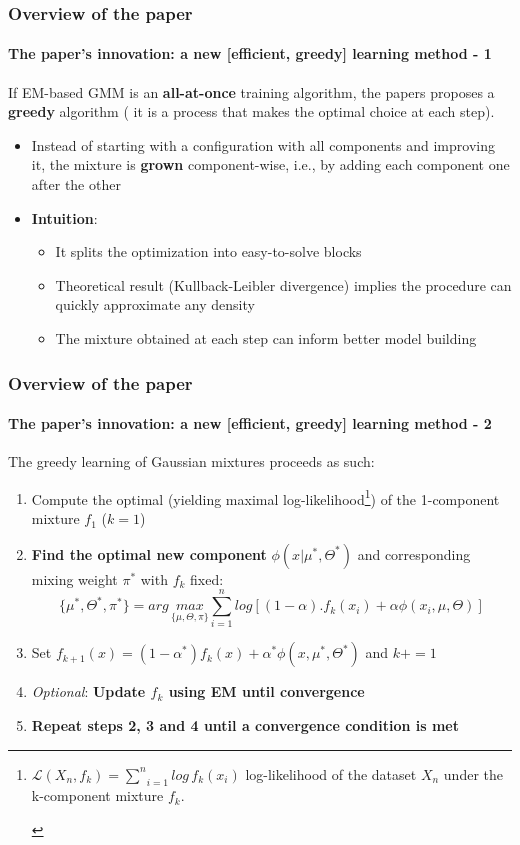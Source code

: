 \documentclass[aspectratio=43]{beamer}
\begin{document}
\begin{frame}
    \frametitle{Overview of the paper}
    \framesubtitle{The paper's innovation: a new [efficient, greedy] learning method - 1}
    If EM-based GMM is an \textbf{all-at-once} training algorithm, the papers proposes a \textbf{greedy} algorithm ( it is a process that makes the optimal choice at each step).
    \begin{small}\begin{itemize}
      \item Instead of starting with a configuration with all components and improving it, the mixture is \textbf{grown} component-wise, i.e., by adding each component one after the other
      \item \textbf{Intuition}: 
      \begin{itemize}
        \item It splits the optimization into easy-to-solve blocks
        \item Theoretical result (Kullback-Leibler divergence) implies the procedure can quickly approximate any density
        \item The mixture obtained at each step can inform better model building
      \end{itemize}
    \end{itemize}\end{small}
\end{frame}

\begin{frame}
    \frametitle{Overview of the paper}
    \framesubtitle{The paper's innovation: a new [efficient, greedy] learning method - 2}
    The greedy learning of Gaussian mixtures proceeds as such:
    \begin{small}\begin{enumerate}
      \item Compute the optimal (yielding maximal log-likelihood\footnote{\begin{scriptsize}$\mathcal{L}(X_n, f_k) = \underset{i=1}{\overset{n}{\sum}}log\,f_k(x_i)$ log-likelihood of the dataset $X_n$ under the k-component mixture $f_k$.\end{scriptsize}}) of the 1-component mixture $f_1$ ($k=1$)
      \item \textbf{Find the optimal new component} $\phi(x|\mu^\ast, \Theta^\ast)$ and corresponding mixing weight $\pi^\ast$ with $f_k$ fixed:
      $$\{\mu^\ast, \Theta^\ast, \pi^\ast\} = arg\, \underset{\{\mu, \Theta, \pi\}}{max}\underset{i=1}{\overset{n}{\sum}}log[(1-\alpha).f_k(x_i)+\alpha\phi(x_i, \mu, \Theta)]$$
      \item Set $f_{k+1}(x)=(1-\alpha^\ast)f_k(x)+\alpha^\ast\phi(x,\mu^\ast,\Theta^\ast)$ and $k += 1$
      \item \textit{Optional}: \textbf{Update $f_k$ using EM until convergence}
      \item \textbf{Repeat steps 2, 3 and 4 until a convergence condition is met}
    \end{enumerate}\end{small}
\end{frame}
\end{document}
